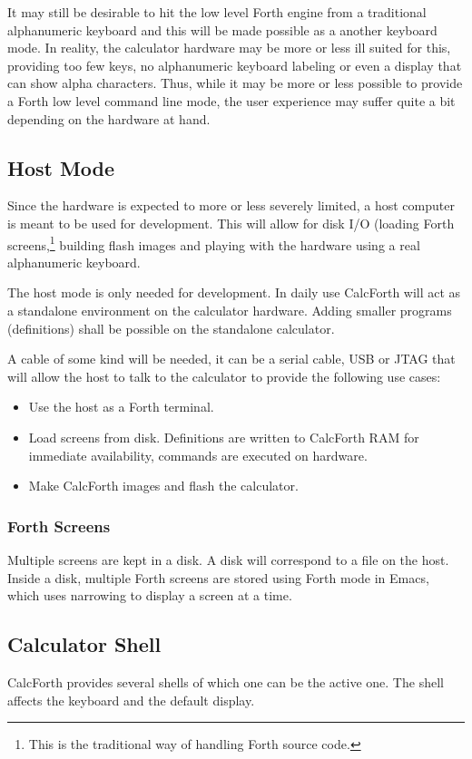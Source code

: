 \documentclass[a4paper]{article}
\begin{document}
It may still be desirable to hit the low level Forth engine from a traditional alphanumeric keyboard and this will be made possible as a another keyboard mode. In reality, the calculator hardware may be more or less ill suited for this, providing too few keys, no alphanumeric keyboard labeling or even a display that can show alpha characters. Thus, while it may be more or less possible to provide a Forth low level command line mode, the user experience may suffer quite a bit depending on the hardware at hand.

\subsection{Host Mode}
Since the hardware is expected to more or less severely limited, a host computer is meant to be used for development. This will allow for disk I/O (loading Forth screens,\footnote{This is the traditional way of handling Forth source code.} building flash images and playing with the hardware using a real alphanumeric keyboard.

The host mode is only needed for development. In daily use CalcForth will act as a standalone environment on the calculator hardware. Adding smaller programs (definitions) shall be possible on the standalone calculator.

A cable of some kind will be needed, it can be a serial cable, USB or JTAG that will allow the host to talk to the calculator to provide the following use cases:
\begin{itemize}
\item Use the host as a Forth terminal.
\item Load screens from disk. Definitions are written to CalcForth RAM for immediate availability, commands are executed on hardware.
\item Make CalcForth images and flash the calculator.
\end{itemize}

\subsubsection{Forth Screens}
Multiple screens are kept in a disk. A disk will correspond to a file on the host. Inside a disk, multiple Forth screens are stored using Forth mode in Emacs, which uses narrowing to display a screen at a time.


\subsection{Calculator Shell}
CalcForth provides several shells of which one can be the active one. The shell affects the keyboard and the default display.
\end{document}
